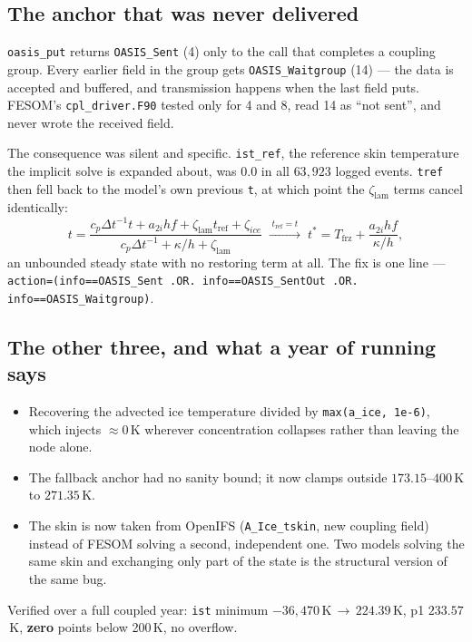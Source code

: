 \documentclass[10pt]{article}
\begin{document}
\subsection{The anchor that was never delivered}\label{sub:r34waitgroup}
\texttt{oasis\_put} returns \texttt{OASIS\_Sent} (4) only to the call that completes a
coupling group. Every earlier field in the group gets \texttt{OASIS\_Waitgroup} (14) --- the
data is accepted and buffered, and transmission happens when the last field puts. FESOM's
\texttt{cpl\_driver.F90} tested only for 4 and 8, read 14 as ``not sent'', and never wrote
the received field.

The consequence was silent and specific. \texttt{ist\_ref}, the reference skin temperature
the implicit solve is expanded about, was 0.0 in all $63{,}923$ logged events. \texttt{tref}
then fell back to the model's own previous \texttt{t}, at which point the
$\zeta_{\mathrm{lam}}$ terms cancel identically:
\[
 t=\frac{c_p\Delta t^{-1}t + a_{2i}hf + \zeta_{\mathrm{lam}}t_{\mathrm{ref}} + \zeta_{ice}}
        {c_p\Delta t^{-1} + \kappa/h + \zeta_{\mathrm{lam}}}
 \;\xrightarrow{\;t_{\mathrm{ref}}=t\;}\;
 t^{*}=T_{\mathrm{frz}} + \frac{a_{2i}hf}{\kappa/h},
\]
an unbounded steady state with no restoring term at all. The fix is one line ---
\texttt{action=(info==OASIS\_Sent .OR. info==OASIS\_SentOut .OR. info==OASIS\_Waitgroup)}.

\subsection{The other three, and what a year of running says}\label{sub:r34three}
\begin{itemize}\itemsep2pt
\item Recovering the advected ice temperature divided by \texttt{max(a\_ice, 1e-6)}, which
injects ${\approx}0$\,K wherever concentration collapses rather than leaving the node alone.
\item The fallback anchor had no sanity bound; it now clamps outside $173.15$--$400$\,K to
$271.35$\,K.
\item The skin is now taken from OpenIFS (\texttt{A\_Ice\_tskin}, new coupling field)
instead of FESOM solving a second, independent one. Two models solving the same skin and
exchanging only part of the state is the structural version of the same bug.
\end{itemize}
Verified over a full coupled year: \texttt{ist} minimum $-36{,}470$\,K\,$\to$\,$224.39$\,K,
p1 $233.57$\,K, \textbf{zero} points below 200\,K, no overflow.
\end{document}
